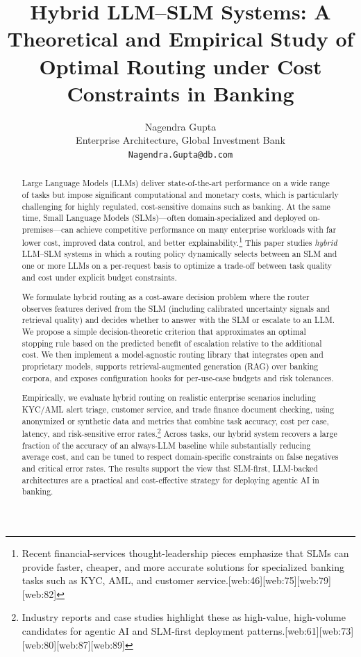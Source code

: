 \documentclass[11pt]{article}
\title{Hybrid LLM--SLM Systems: A Theoretical and Empirical Study of Optimal Routing under Cost Constraints in Banking}
\author{Nagendra Gupta\\
Enterprise Architecture, Global Investment Bank\\
\texttt{Nagendra.Gupta@db.com}
}
\date{}
\begin{document}
\maketitle

\begin{abstract}
Large Language Models (LLMs) deliver state-of-the-art performance on a wide range of tasks but impose significant computational and monetary costs, which is particularly challenging for highly regulated, cost-sensitive domains such as banking. At the same time, Small Language Models (SLMs)---often domain-specialized and deployed on-premises---can achieve competitive performance on many enterprise workloads with far lower cost, improved data control, and better explainability.\footnote{Recent financial-services thought-leadership pieces emphasize that SLMs can provide faster, cheaper, and more accurate solutions for specialized banking tasks such as KYC, AML, and customer service.[web:46][web:75][web:79][web:82]} This paper studies \emph{hybrid} LLM--SLM systems in which a routing policy dynamically selects between an SLM and one or more LLMs on a per-request basis to optimize a trade-off between task quality and cost under explicit budget constraints. 

We formulate hybrid routing as a cost-aware decision problem where the router observes features derived from the SLM (including calibrated uncertainty signals and retrieval quality) and decides whether to answer with the SLM or escalate to an LLM. We propose a simple decision-theoretic criterion that approximates an optimal stopping rule based on the predicted benefit of escalation relative to the additional cost. We then implement a model-agnostic routing library that integrates open and proprietary models, supports retrieval-augmented generation (RAG) over banking corpora, and exposes configuration hooks for per-use-case budgets and risk tolerances. 

Empirically, we evaluate hybrid routing on realistic enterprise scenarios including KYC/AML alert triage, customer service, and trade finance document checking, using anonymized or synthetic data and metrics that combine task accuracy, cost per case, latency, and risk-sensitive error rates.\footnote{Industry reports and case studies highlight these as high-value, high-volume candidates for agentic AI and SLM-first deployment patterns.[web:61][web:73][web:80][web:87][web:89]} Across tasks, our hybrid system recovers a large fraction of the accuracy of an always-LLM baseline while substantially reducing average cost, and can be tuned to respect domain-specific constraints on false negatives and critical error rates. The results support the view that SLM-first, LLM-backed architectures are a practical and cost-effective strategy for deploying agentic AI in banking.
\end{abstract}
\end{document}
